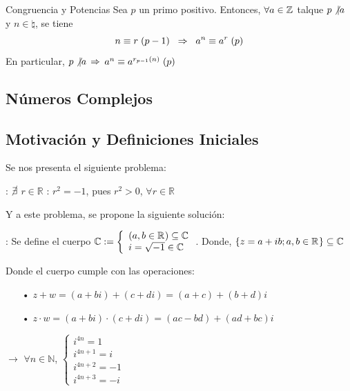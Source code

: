 \documentclass[10pt]{article}
\begin{document}
\begin{cor}{Congruencia y Potencias}
Sea $p$ un primo positivo. Entonces, $\forall a \in \entero{}$ talque $p \not\vert a$ y $n \in \natural{}$, se tiene
\[\congruente{n}{r}{p-1} \es{0.2} \implica \es{0.2} \congruente{a^n}{a^r}{p}\]
En particular, $p \not\vert a$ $\implica$ $\congruente{a^n}{a^{r_{p-1}(n)}}{p}$
\end{cor}

\begin{center}
\section{Números Complejos} 
\subsection{Motivación y Definiciones Iniciales}
\end{center}
Se nos presenta el siguiente problema:

\vspace{0.2cm}

: $\cancel{\exists}$ $r \in \mathbb{R}$ : $r^2 = -1$, pues $r^2 > 0$, $\forall r \in \mathbb{R}$  

\vspace{0.2cm}

Y a este problema, se propone la siguiente solución:

\vspace{0.2cm}

: Se define el cuerpo $\mathbb{C}:= \left\lbrace \begin{array}{l}
(a, b \in \real{}) \contenido \mathbb{C}\\
i = \sqrt{-1} \in \mathbb{C}
\end{array} \right.$. Donde, $\lbrace z = a + ib ; a, b \in \real{} \rbrace \contenido \mathbb{C}$ 

Donde el cuerpo cumple con las operaciones: 
\begin{itemize}
\item[•] $ z+w = (a+bi) + (c+di) = (a+c) + (b+d)i$ 
\item[•] $z \cdot w = (a+bi) \cdot (c+di) = (ac-bd) + (ad + bc)i$
\end{itemize}

 $\rightarrow$ $\forall n \in \mathbb{N}$, $\left\lbrace \begin{array}{l}
i^{4n} = 1 \\
i^{4n+1} = i \\
i^{4n+2} = -1 \\
i^{4n + 3} = -i  
\end{array}\right.$
\end{document}
